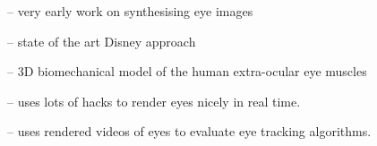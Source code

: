 \cite{feng1998variance} -- very early work on synthesising eye images

\cite{berard2014highquality} -- state of the art Disney approach


\cite{priamikov14_openeyesim} -- 3D biomechanical model of the human extra-ocular eye muscles

\cite{ActiBlizEyes} -- uses lots of hacks to render eyes nicely in real time.

\cite{swirski2014rendering} -- uses rendered videos of eyes to evaluate eye tracking algorithms.




